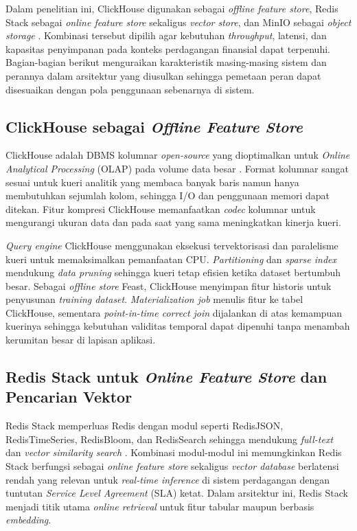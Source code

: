 Dalam penelitian ini, ClickHouse digunakan sebagai \textit{offline feature store}, Redis Stack sebagai \textit{online feature store} sekaligus \textit{vector store}, dan MinIO sebagai \textit{object storage} \autocite{clickhouse2024,redis2024,minio2024}. Kombinasi tersebut dipilih agar kebutuhan \textit{throughput}, latensi, dan kapasitas penyimpanan pada konteks perdagangan finansial dapat terpenuhi. Bagian-bagian berikut menguraikan karakteristik masing-masing sistem dan perannya dalam arsitektur yang diusulkan sehingga pemetaan peran dapat disesuaikan dengan pola penggunaan sebenarnya di sistem.

\subsection{ClickHouse sebagai \textit{Offline Feature Store}}
\label{sec:clickhouse}

ClickHouse adalah DBMS kolumnar \textit{open-source} yang dioptimalkan untuk \textit{Online Analytical Processing} (OLAP) pada volume data besar \autocite{clickhouse2024}. Format kolumnar sangat sesuai untuk kueri analitik yang membaca banyak baris namun hanya membutuhkan sejumlah kolom, sehingga I/O dan penggunaan memori dapat ditekan. Fitur kompresi ClickHouse memanfaatkan \textit{codec} kolumnar untuk mengurangi ukuran data dan pada saat yang sama meningkatkan kinerja kueri.

\textit{Query engine} ClickHouse menggunakan eksekusi tervektorisasi dan paralelisme kueri untuk memaksimalkan pemanfaatan CPU. \textit{Partitioning} dan \textit{sparse index} mendukung \textit{data pruning} sehingga kueri tetap efisien ketika dataset bertumbuh besar. Sebagai \textit{offline store} Feast, ClickHouse menyimpan fitur historis untuk penyusunan \textit{training dataset}. \textit{Materialization job} menulis fitur ke tabel ClickHouse, sementara \textit{point-in-time correct join} dijalankan di atas kemampuan kuerinya sehingga kebutuhan validitas temporal dapat dipenuhi tanpa menambah kerumitan besar di lapisan aplikasi.

\subsection{Redis Stack untuk \textit{Online Feature Store} dan Pencarian Vektor}
\label{sec:redis}

Redis Stack memperluas Redis dengan modul seperti RedisJSON, RedisTimeSeries, RedisBloom, dan RedisSearch sehingga mendukung \textit{full-text} dan \textit{vector similarity search} \autocite{redis2024}. Kombinasi modul-modul ini memungkinkan Redis Stack berfungsi sebagai \textit{online feature store} sekaligus \textit{vector database} berlatensi rendah yang relevan untuk \textit{real-time inference} di sistem perdagangan dengan tuntutan \textit{Service Level Agreement} (SLA) ketat. Dalam arsitektur ini, Redis Stack menjadi titik utama \textit{online retrieval} untuk fitur tabular maupun berbasis \textit{embedding}.

